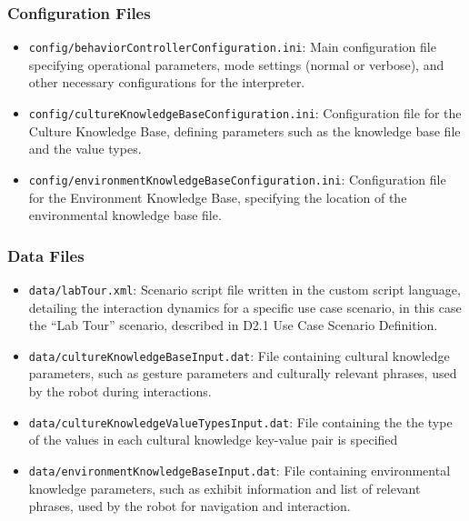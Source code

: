 \documentclass{CSSRforAfrica}
\begin{document}
\subsubsection{Configuration Files}
\begin{itemize}
    \item \texttt{\small config/\textnormal{behaviorControllerConfiguration.ini}}: Main configuration file specifying operational parameters, mode settings (normal or verbose), and other necessary configurations for the interpreter.
    
    \item \texttt{\small config/\textnormal{cultureKnowledgeBaseConfiguration.ini}}: Configuration file for the Culture Knowledge Base, defining parameters such as the knowledge base file and the value types.

    \item \texttt{\small config/\textnormal{environmentKnowledgeBaseConfiguration.ini}}: Configuration file for the Environment Knowledge Base, specifying the location of the environmental knowledge base file.


\end{itemize}

\subsubsection{Data Files}
\begin{itemize}
    \item \texttt{\small data/\textnormal{labTour.xml}}: Scenario script file written in the custom script language, detailing the interaction dynamics for a specific use case scenario, in this case the ``Lab Tour'' scenario, described in \textnormal{D2.1 Use Case Scenario Definition}.
    
    \item \texttt{\small data/\textnormal{cultureKnowledgeBaseInput.dat}}: File containing cultural knowledge parameters, such as gesture parameters and culturally relevant phrases, used by the robot during interactions.
    
    \item \texttt{\small data/\textnormal{cultureKnowledgeValueTypesInput.dat}}: File containing the the type of the values in each cultural knowledge key-value pair is specified
    
    \item \texttt{\small data/\textnormal{environmentKnowledgeBaseInput.dat}}: File containing environmental knowledge parameters, such as exhibit information and list of relevant phrases, used by the robot for navigation and interaction.
\end{itemize}
\end{document}
